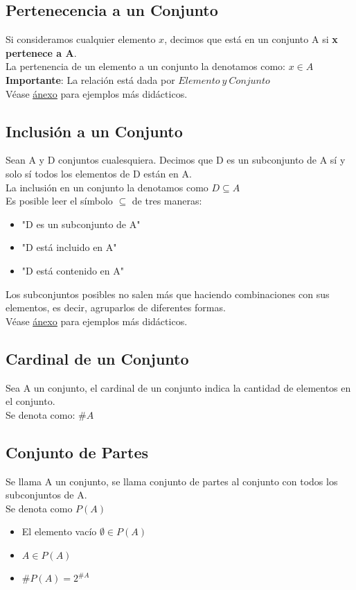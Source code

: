\documentclass[10pt,a4paper]{article}
\begin{document}
\subsection*{Pertenecencia a un Conjunto}
Si consideramos cualquier elemento $x$, decimos que está en un conjunto A si \textbf{x pertenece a A}. \\
La pertenencia de un elemento a un conjunto la denotamos como: $x \in A$ \\
\textbf{Importante}: La relación está dada por $Elemento \ y \ Conjunto$ \\
Véase \hyperref[subsec:pertenecencia_conjuntos]{\underline{ánexo}} para ejemplos más didácticos.
\subsection*{Inclusión a un Conjunto}
Sean A y D conjuntos cualesquiera.
Decimos que D es un subconjunto de A sí y solo sí todos los elementos de D están en A. \\
La inclusión en un conjunto la denotamos como $D \subseteq A$ \\
Es posible leer el símbolo $ \subseteq $ de tres maneras: 
\begin{itemize}
    \item "D es un subconjunto de A"
    \item "D está incluido en A"
    \item "D está contenido en A"
\end{itemize}
Los subconjuntos posibles no salen más que haciendo combinaciones con sus elementos, es decir, agruparlos de diferentes formas. \\
Véase \hyperref[subsec:inclusion_conjuntos]{\underline{ánexo}} para ejemplos más didácticos.
\subsection*{Cardinal de un Conjunto}
Sea A un conjunto, el cardinal de un conjunto indica la cantidad de elementos en el conjunto. \\
Se denota como: $\#A$
\subsection*{Conjunto de Partes}
Se llama A un conjunto, se llama conjunto de partes al conjunto con todos los subconjuntos de A. \\
Se denota como $P(A)$
\begin{itemize}
    \item El elemento vacío $\emptyset \in P(A)$
    \item $A \in P(A)$
    \item $\#P(A) = 2^{\#A}$
\end{itemize}
\end{document}
